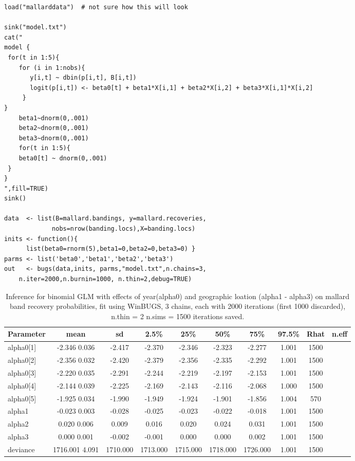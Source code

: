 {\small
\begin{verbatim}
load("mallarddata")  # not sure how this will look

sink("model.txt")
cat("
model {
 for(t in 1:5){
    for (i in 1:nobs){
       y[i,t] ~ dbin(p[i,t], B[i,t])
       logit(p[i,t]) <- beta0[t] + beta1*X[i,1] + beta2*X[i,2] + beta3*X[i,1]*X[i,2]
     }
}
	beta1~dnorm(0,.001)
	beta2~dnorm(0,.001)
	beta3~dnorm(0,.001)
	for(t in 1:5){
 	beta0[t] ~ dnorm(0,.001)
 }
}
",fill=TRUE)
sink()

data  <- list(B=mallard.bandings, y=mallard.recoveries,
             nobs=nrow(banding.locs),X=banding.locs)
inits <- function(){
      list(beta0=rnorm(5),beta1=0,beta2=0,beta3=0) }
parms <- list('beta0','beta1','beta2','beta3')
out   <- bugs(data,inits, parms,"model.txt",n.chains=3,
 	n.iter=2000,n.burnin=1000, n.thin=2,debug=TRUE)
\end{verbatim}
}

\begin{table}
\caption{Inference for binomial GLM with effects of year(alpha0) and geographic loation (alpha1 - alpha3) on mallard band recovery probabilities, fit using WinBUGS, 3 chains, each with 2000 iterations (first 1000 discarded), n.thin = 2
 n.sims = 1500 iterations saved.}
   \scriptsize
  \begin{tabular}{lccccccccc}
    \hline
        \hline
 Parameter &    mean   & sd   &  2.5\%    &  25\%  &    50\%   &   75\%  &  97.5\% & Rhat & n.eff \\
     \hline
alpha0[1]  & -2.346 0.036 &  -2.417 &  -2.370 &  -2.346 &  -2.323 &  -2.277 & 1.001 & 1500 \\
alpha0[2] &  -2.356 0.032 &  -2.420 &  -2.379 &  -2.356 &  -2.335 &  -2.292 & 1.001 & 1500 \\
alpha0[3] &  -2.220 0.035 &  -2.291 &  -2.244 &  -2.219 &  -2.197 &  -2.153 & 1.001 & 1500 \\
alpha0[4] &  -2.144 0.039 &  -2.225 &  -2.169 &  -2.143 &  -2.116 &  -2.068 & 1.000 & 1500 \\
alpha0[5] &  -1.925 0.034 &  -1.990 &  -1.949 &  -1.924 &  -1.901 &  -1.856 & 1.004 & 570 \\
alpha1    &  -0.023 0.003 &  -0.028 &  -0.025 &  -0.023 &  -0.022 &  -0.018 & 1.001 & 1500 \\
alpha2    &   0.020 0.006 &   0.009 &   0.016 &   0.020 &   0.024 &   0.031 & 1.001 & 1500 \\
alpha3    &   0.000 0.001 &  -0.002 &  -0.001 &   0.000 &   0.000 &   0.002 & 1.001 & 1500 \\
deviance & 1716.001 4.091 & 1710.000 & 1713.000 & 1715.000 & 1718.000 & 1726.000 & 1.001 & 1500 \\
    \hline
  \end{tabular}
  \label{glms.tab.mallard}
\vspace{0.5cm}
\end{table}


